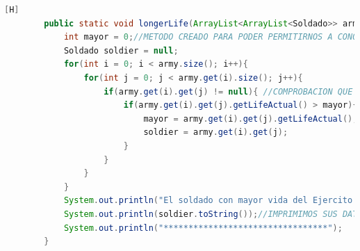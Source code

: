 \documentclass{article}
\begin{document}
	\begin{lstlisting}[language=java,caption={Las lineas de codigos del metodo creado:}][H]
		public static void longerLife(ArrayList<ArrayList<Soldado>> army, int num){
			int mayor = 0;//METODO CREADO PARA PODER PERMITIRNOS A CONOCER EL SOLDADO CON MAYOR VIDA DE CADA EJERCITO 
			Soldado soldier = null;
			for(int i = 0; i < army.size(); i++){
				for(int j = 0; j < army.get(i).size(); j++){
					if(army.get(i).get(j) != null){ //COMPROBACION QUE HACEMOS PARA PODER DECIR QUE EL CASILLERO DONDE ESTAMOS ES UN SOLDADO QUE EXISTE
						if(army.get(i).get(j).getLifeActual() > mayor){ //COMPARAMOS PUNTOS DE VIDA DE CADA SOLDADO PARA VER QUIEN ES EL MAYOR 
							mayor = army.get(i).get(j).getLifeActual();
							soldier = army.get(i).get(j);
						}
					}
				}
			}
			System.out.println("El soldado con mayor vida del Ejercito " + num + " es: ");
			System.out.println(soldier.toString());//IMPRIMIMOS SUS DATOS PARA PODER VER DE QUE SOLDADO SE TRATA 
			System.out.println("*********************************");
		}

	\end{lstlisting}
\end{document}
